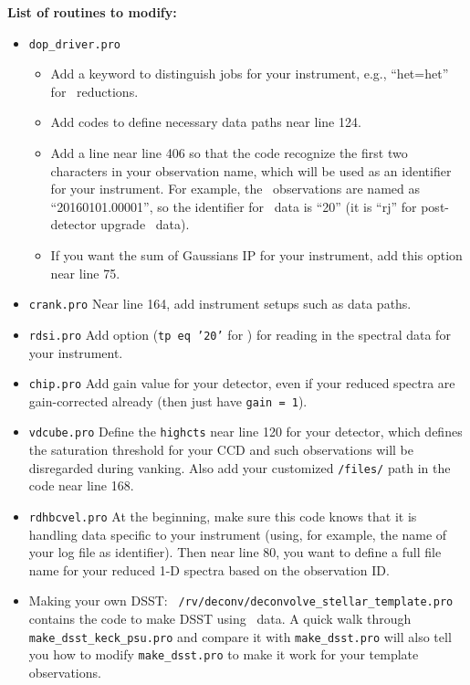 {\bf List of routines to modify:}
\begin{itemize}
\item {\tt dop\_driver.pro}
  \begin{itemize}
    \item Add a keyword to distinguish jobs for your instrument, e.g.,
      ``het=het'' for \het\ reductions.
    \item Add codes to define necessary data paths near line 124.
    \item Add a line near line 406 so that the code recognize the
      first two characters in your observation name, which will be used as
      an identifier for your instrument. For example, the \het\ observations
      are named as ``20160101.00001'', so the identifier for \het\ data is
      ``20'' (it is ``rj'' for post-detector upgrade \keck\ data).
    \item If you want the sum of Gaussians IP for your instrument,
      add this option near line 75.
  \end{itemize}
\item {\tt crank.pro} Near line 164, add instrument setups such as
  data paths.
\item {\tt rdsi.pro} Add option ({\tt tp eq '20'} for \het) for
  reading in the spectral data for your instrument.
\item {\tt chip.pro} Add gain value for your detector, even if your
  reduced spectra are gain-corrected already (then just have {\tt gain =
    1}).
\item {\tt vdcube.pro} Define the {\tt highcts} near line 120 for your
  detector, which defines the saturation threshold for your CCD and such
  observations will be disregarded during vanking. Also add your
  customized {\tt /files/} path in the code near line 168.
\item {\tt rdhbcvel.pro} At the beginning, make sure this code knows
  that it is handling data specific to your instrument (using, for
  example, the name of your log file as identifier). Then near line 80,
  you want to define a full file name for your reduced 1-D spectra based
  on the observation ID.
\item Making your own DSST: {\tt
    /rv/deconv/deconvolve\_stellar\_template.pro} contains the code to
  make DSST using \het\ data. A quick walk through {\tt
    make\_dsst\_keck\_psu.pro} and compare it with {\tt make\_dsst.pro}
  will also tell you how to modify {\tt make\_dsst.pro} to make it work
  for your template observations.
\end{itemize}


